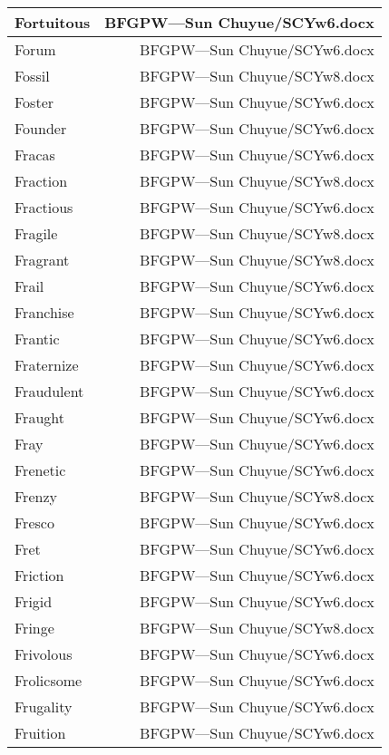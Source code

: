 \documentclass{article}
\begin{document}
\begin{center}
\begin{longtable}{|l|r|}
\hline
Fortuitous  &  BFGPW---Sun Chuyue/SCYw6.docx\\  
\hline
Forum  &  BFGPW---Sun Chuyue/SCYw6.docx\\  
\hline
Fossil  &  BFGPW---Sun Chuyue/SCYw8.docx\\  
\hline
Foster  &  BFGPW---Sun Chuyue/SCYw6.docx\\  
\hline
Founder  &  BFGPW---Sun Chuyue/SCYw6.docx\\  
\hline
Fracas  &  BFGPW---Sun Chuyue/SCYw6.docx\\  
\hline
Fraction  &  BFGPW---Sun Chuyue/SCYw8.docx\\  
\hline
Fractious  &  BFGPW---Sun Chuyue/SCYw6.docx\\  
\hline
Fragile  &  BFGPW---Sun Chuyue/SCYw8.docx\\  
\hline
Fragrant  &  BFGPW---Sun Chuyue/SCYw8.docx\\  
\hline
Frail  &  BFGPW---Sun Chuyue/SCYw6.docx\\  
\hline
Franchise  &  BFGPW---Sun Chuyue/SCYw6.docx\\  
\hline
Frantic  &  BFGPW---Sun Chuyue/SCYw6.docx\\  
\hline
Fraternize  &  BFGPW---Sun Chuyue/SCYw6.docx\\  
\hline
Fraudulent  &  BFGPW---Sun Chuyue/SCYw6.docx\\  
\hline
Fraught  &  BFGPW---Sun Chuyue/SCYw6.docx\\  
\hline
Fray  &  BFGPW---Sun Chuyue/SCYw6.docx\\  
\hline
Frenetic  &  BFGPW---Sun Chuyue/SCYw6.docx\\  
\hline
Frenzy  &  BFGPW---Sun Chuyue/SCYw8.docx\\  
\hline
Fresco  &  BFGPW---Sun Chuyue/SCYw6.docx\\  
\hline
Fret  &  BFGPW---Sun Chuyue/SCYw6.docx\\  
\hline
Friction  &  BFGPW---Sun Chuyue/SCYw6.docx\\  
\hline
Frigid  &  BFGPW---Sun Chuyue/SCYw6.docx\\  
\hline
Fringe  &  BFGPW---Sun Chuyue/SCYw8.docx\\  
\hline
Frivolous  &  BFGPW---Sun Chuyue/SCYw6.docx\\  
\hline
Frolicsome  &  BFGPW---Sun Chuyue/SCYw6.docx\\  
\hline
Frugality  &  BFGPW---Sun Chuyue/SCYw6.docx\\  
\hline
Fruition  &  BFGPW---Sun Chuyue/SCYw6.docx\\  

\end{longtable}
\end{center}
\end{document}
